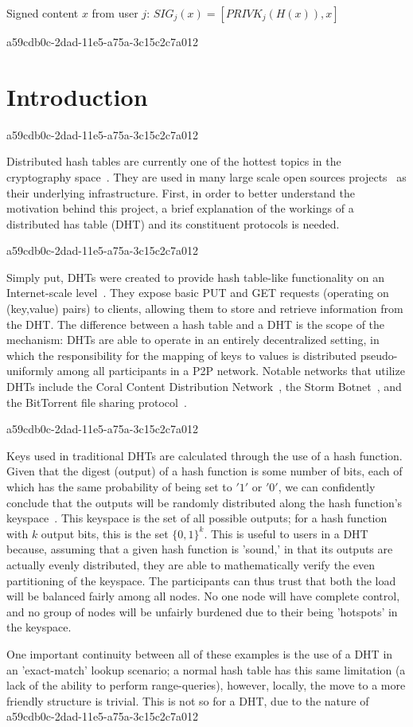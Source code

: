 \documentclass[12pt]{article}
\begin{document}
Signed content $x$ from user $j$: $SIG_j(x) = \left[ PRIVK_j( H(x) ), x \right]$

a59cdb0c-2dad-11e5-a75a-3c15c2c7a012\section{Introduction}
a59cdb0c-2dad-11e5-a75a-3c15c2c7a012\par Distributed hash tables are currently one of the hottest topics in the cryptography space~\cite{Stoica:2001dj,Rowstron:2001ea,Ratnasamy:2001wn}. They are used in many large scale open sources projects~\cite{Freitas:2013tb,Xu:2010vs,Perfitt:2010fh} as their underlying infrastructure. First, in order to better understand the motivation behind this project, a brief explanation of the workings of a distributed has table (DHT) and its constituent protocols is needed.

a59cdb0c-2dad-11e5-a75a-3c15c2c7a012\par Simply put, DHTs were created to provide hash table-like functionality on an Internet-scale level~\cite{Ratnasamy:2001wn}. They expose basic PUT and GET requests (operating on (key,value) pairs) to clients, allowing them to store and retrieve information from the DHT. The difference between a hash table and a DHT is the scope of the mechanism: DHTs are able to operate in an entirely decentralized setting, in which the responsibility for the mapping of keys to values is distributed pseudo-uniformly among all participants in a P2P network. Notable networks that utilize DHTs include the Coral Content Distribution Network~\cite{Freedman:2004vb}, the Storm Botnet~\cite{Holz:2008uk}, and the BitTorrent file sharing protocol~\cite{Cohen:y1_8mBnw}.

a59cdb0c-2dad-11e5-a75a-3c15c2c7a012\par Keys used in traditional DHTs are calculated through the use of a hash function. Given that the digest (output) of a hash function is some number of bits, each of which has the same probability of being set to $'1'$ or $'0'$, we can confidently conclude that the outputs will be randomly distributed along the hash function's keyspace~. This keyspace is the set of all possible outputs; for a hash function with $k$ output bits, this is the set $\{0,1\}^k$. This is useful to users in a DHT because, assuming that a given hash function is 'sound,' in that its outputs are actually evenly distributed, they are able to mathematically verify the even partitioning of the keyspace. The participants can thus trust that both the load will be balanced fairly among all nodes. No one node will have complete control, and no group of nodes will be unfairly burdened due to their being 'hotspots' in the keyspace.~

\par One important continuity between all of these examples is the use of a DHT in an 'exact-match' lookup scenario; a normal hash table has this same limitation (a lack of the ability to perform range-queries), however, locally, the move to a more friendly structure is trivial. This is not so for a DHT, due to the nature of
\printbibliography
a59cdb0c-2dad-11e5-a75a-3c15c2c7a012
\end{document}
